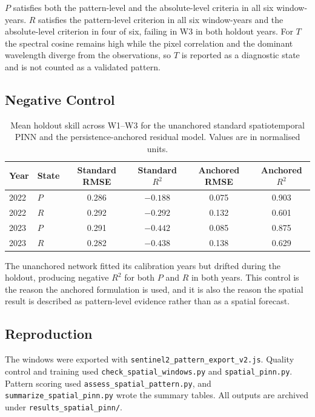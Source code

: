 \documentclass[12pt,a4paper]{article}
\begin{document}
$P$ satisfies both the pattern-level and the absolute-level criteria in all six window-years. $R$ satisfies the pattern-level criterion in all six window-years and the absolute-level criterion in four of six, failing in W3 in both holdout years. For $T$ the spectral cosine remains high while the pixel correlation and the dominant wavelength diverge from the observations, so $T$ is reported as a diagnostic state and is not counted as a validated pattern.

\subsection{Negative Control}

\begin{table}[H]
	\centering
	\caption{Mean holdout skill across W1--W3 for the unanchored standard spatiotemporal PINN and the persistence-anchored residual model. Values are in normalised units.}
	\label{tab:s9_control}
	\small
	\begin{tabular}{llcccc}
		\toprule
		Year & State & Standard RMSE & Standard $R^2$ & Anchored RMSE & Anchored $R^2$ \\
		\midrule
		2022 & $P$ & 0.286 & $-0.188$ & 0.075 & 0.903 \\
		2022 & $R$ & 0.292 & $-0.292$ & 0.132 & 0.601 \\
		2023 & $P$ & 0.291 & $-0.442$ & 0.085 & 0.875 \\
		2023 & $R$ & 0.282 & $-0.438$ & 0.138 & 0.629 \\
		\bottomrule
	\end{tabular}
\end{table}

The unanchored network fitted its calibration years but drifted during the holdout, producing negative $R^2$ for both $P$ and $R$ in both years. This control is the reason the anchored formulation is used, and it is also the reason the spatial result is described as pattern-level evidence rather than as a spatial forecast.

\subsection{Reproduction}

\begin{sloppypar}
The windows were exported with \texttt{sentinel2\_pattern\_export\_v2.js}. Quality control and training used \texttt{check\_spatial\_windows.py} and \texttt{spatial\_pinn.py}. Pattern scoring used \texttt{assess\_spatial\_pattern.py}, and \texttt{summarize\_spatial\_pinn.py} wrote the summary tables. All outputs are archived under \texttt{results\_spatial\_pinn/}.
\end{sloppypar}
\end{document}
